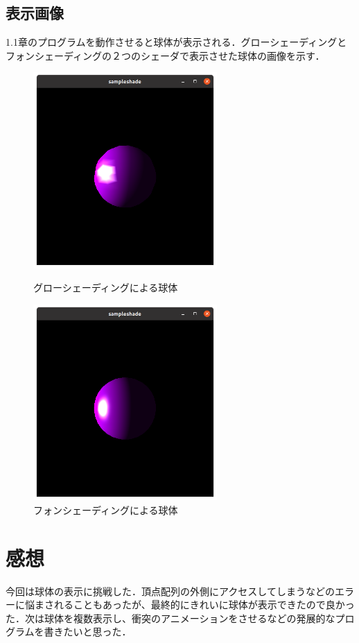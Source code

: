 \documentclass[12pt]{jreport}
\begin{document}
\section{表示画像}
1.1章のプログラムを動作させると球体が表示される．グローシェーディングとフォンシェーディングの２つのシェーダで表示させた球体の画像を示す．

\begin{figure}
\begin{center}
\includegraphics[width=70mm]{grourad.png}
\end{center}
\caption{グローシェーディングによる球体}

\begin{center}
\includegraphics[width=70mm]{phong.png}
\end{center}
\caption{フォンシェーディングによる球体}

\end{figure}

\clearpage

\chapter{感想}
今回は球体の表示に挑戦した．頂点配列の外側にアクセスしてしまうなどのエラーに悩まされることもあったが、最終的にきれいに球体が表示できたので良かった．次は球体を複数表示し、衝突のアニメーションをさせるなどの発展的なプログラムを書きたいと思った．
\end{document}
